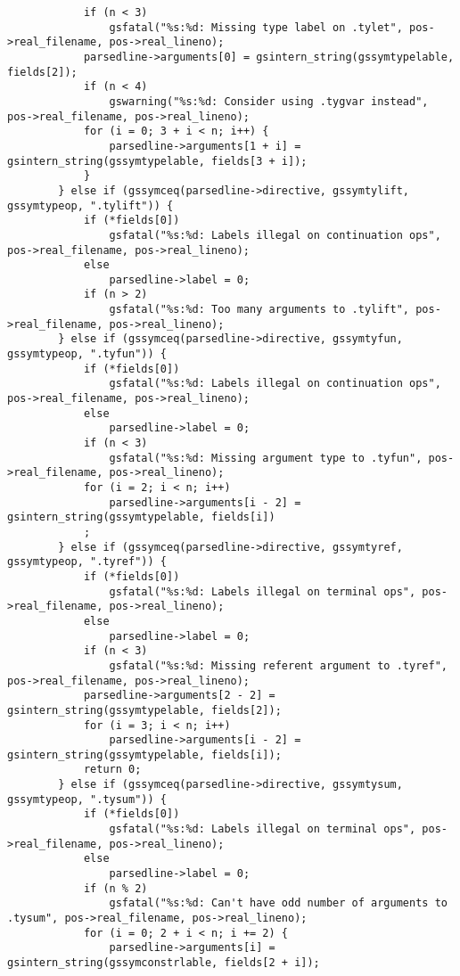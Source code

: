 \documentclass{report}
\begin{document}
\begin{verbatim}
            if (n < 3)
                gsfatal("%s:%d: Missing type label on .tylet", pos->real_filename, pos->real_lineno);
            parsedline->arguments[0] = gsintern_string(gssymtypelable, fields[2]);
            if (n < 4)
                gswarning("%s:%d: Consider using .tygvar instead", pos->real_filename, pos->real_lineno);
            for (i = 0; 3 + i < n; i++) {
                parsedline->arguments[1 + i] = gsintern_string(gssymtypelable, fields[3 + i]);
            }
        } else if (gssymceq(parsedline->directive, gssymtylift, gssymtypeop, ".tylift")) {
            if (*fields[0])
                gsfatal("%s:%d: Labels illegal on continuation ops", pos->real_filename, pos->real_lineno);
            else
                parsedline->label = 0;
            if (n > 2)
                gsfatal("%s:%d: Too many arguments to .tylift", pos->real_filename, pos->real_lineno);
        } else if (gssymceq(parsedline->directive, gssymtyfun, gssymtypeop, ".tyfun")) {
            if (*fields[0])
                gsfatal("%s:%d: Labels illegal on continuation ops", pos->real_filename, pos->real_lineno);
            else
                parsedline->label = 0;
            if (n < 3)
                gsfatal("%s:%d: Missing argument type to .tyfun", pos->real_filename, pos->real_lineno);
            for (i = 2; i < n; i++)
                parsedline->arguments[i - 2] = gsintern_string(gssymtypelable, fields[i])
            ;
        } else if (gssymceq(parsedline->directive, gssymtyref, gssymtypeop, ".tyref")) {
            if (*fields[0])
                gsfatal("%s:%d: Labels illegal on terminal ops", pos->real_filename, pos->real_lineno);
            else
                parsedline->label = 0;
            if (n < 3)
                gsfatal("%s:%d: Missing referent argument to .tyref", pos->real_filename, pos->real_lineno);
            parsedline->arguments[2 - 2] = gsintern_string(gssymtypelable, fields[2]);
            for (i = 3; i < n; i++)
                parsedline->arguments[i - 2] = gsintern_string(gssymtypelable, fields[i]);
            return 0;
        } else if (gssymceq(parsedline->directive, gssymtysum, gssymtypeop, ".tysum")) {
            if (*fields[0])
                gsfatal("%s:%d: Labels illegal on terminal ops", pos->real_filename, pos->real_lineno);
            else
                parsedline->label = 0;
            if (n % 2)
                gsfatal("%s:%d: Can't have odd number of arguments to .tysum", pos->real_filename, pos->real_lineno);
            for (i = 0; 2 + i < n; i += 2) {
                parsedline->arguments[i] = gsintern_string(gssymconstrlable, fields[2 + i]);

\end{verbatim}
\end{document}
